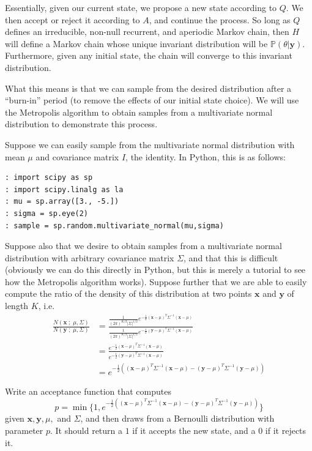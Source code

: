 Essentially, given our current state, we propose a new state according to $Q$. We then accept or reject it according to $A$, and continue the process. So long as $Q$ defines an irreducible, non-null recurrent, and aperiodic Markov chain, then $H$ will define a Markov chain whose unique invariant distribution will be $\mathbb{P}(\theta | \mathbf{y})$. Furthermore, given any initial state, the chain will converge to this invariant distribution.

What this means is that we can sample from the desired distribution after a ``burn-in'' period (to remove the effects of our initial state choice). We will use the Metropolis algorithm to obtain samples from a multivariate normal distribution to demonstrate this process.

Suppose we can easily sample from the multivariate normal distribution with mean $\mu$ and covariance matrix $I$, the identity. In Python, this is as follows:
\begin{lstlisting}
: import scipy as sp
: import scipy.linalg as la
: mu = sp.array([3., -5.])
: sigma = sp.eye(2)
: sample = sp.random.multivariate_normal(mu,sigma)
\end{lstlisting}

Suppose also that we desire to obtain samples from a multivariate normal distribution with arbitrary covariance matrix $\Sigma$, and that this is difficult (obviously we can do this directly in Python, but this is merely a tutorial to see how the Metropolis algorithm works). Suppose further that we are able to easily compute the ratio of the density of this distribution at two points $\mathbf{x}$ and $\mathbf{y}$ of length $K$, i.e.
\begin{align*}
\frac{N(\mathbf{x} \; ; \; \mu, \Sigma)}{N(\mathbf{y} \; ; \; \mu, \Sigma)} & = \frac{\frac{1}{(2\pi)^{K/2}|\Sigma|^{1/2}} e^{-\frac{1}{2}(\mathbf{x} - \mu)^{T} \Sigma^{-1} (\mathbf{x} - \mu)}}{\frac{1}{(2\pi)^{K/2}|\Sigma|^{1/2}} e^{-\frac{1}{2}(\mathbf{y} - \mu)^{T} \Sigma^{-1} (\mathbf{x} - \mu)}} \\
& = \frac{e^{-\frac{1}{2}(\mathbf{x} - \mu)^{T} \Sigma^{-1} (\mathbf{x} - \mu)}}{e^{-\frac{1}{2}(\mathbf{y} - \mu)^{T} \Sigma^{-1} (\mathbf{x} - \mu)}} \\
& = e^{-\frac{1}{2}\left((\mathbf{x} - \mu)^{T} \Sigma^{-1} (\mathbf{x} - \mu) - (\mathbf{y} - \mu)^{T} \Sigma^{-1} (\mathbf{y} - \mu)\right)}
\end{align*}

\begin{problem} \label{problem1}
Write an acceptance function that computes 
\begin{equation*}
p = \min \{1, e^{-\frac{1}{2}\left((\mathbf{x} - \mu)^{T} \Sigma^{-1} (\mathbf{x} - \mu) - (\mathbf{y} - \mu)^{T} \Sigma^{-1} (\mathbf{y} - \mu)\right)}\}
\end{equation*}
given $\mathbf{x}, \mathbf{y}, \mu,$ and $\Sigma$, and then draws from a Bernoulli distribution with parameter $p$. It should return a $1$ if it accepts the new state, and a $0$ if it rejects it.
\end{problem}

